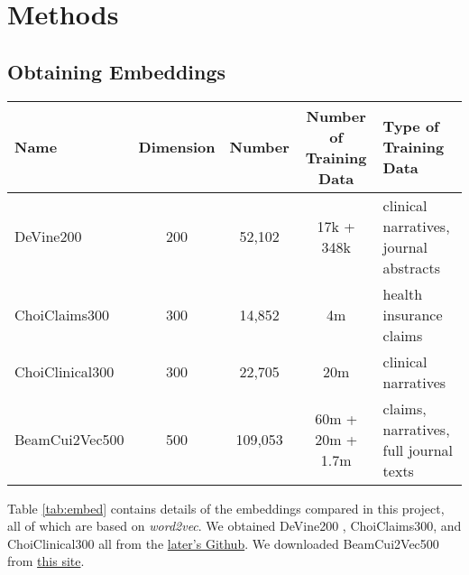 \documentclass[10pt]{article}
\begin{document}


\section{Methods}

\subsection{Obtaining Embeddings}

\begin{table*}[h!]
	\begin{center}
		\label{tab:embed}
		\begin{tabular}{l|c|c|c|l} %
			Name & Dimension & Number & Number of Training Data& Type of Training Data \\
			\hline
			DeVine200 & 200 & 52,102 & 17k + 348k &clinical narratives, journal abstracts\\
			ChoiClaims300 & 300 & 14,852& 4m&health insurance claims\\
			ChoiClinical300 & 300 & 22,705&20m& clinical narratives\\
			BeamCui2Vec500 & 500 & 109,053&60m + 20m + 1.7m& claims, narratives, full journal texts\\
		\end{tabular}
	\end{center}
\caption{Characteristics of the embeddings compared, including the name referred, the embedding dimensions, the number of embeddings in the dataset, and the type of data used to train them.}
\end{table*}

Table \ref{tab:embed} contains details of the embeddings compared in this project, all of which are based on \emph{word2vec}. We obtained DeVine200 \cite{devineMedicalSemanticSimilarity2014}, ChoiClaims300, and ChoiClinical300 \cite{choiLearningLowDimensionalRepresentations2016} all from the \href{https://github.com/clinicalml/embeddings}{later's Github}. We downloaded BeamCui2Vec500 \cite{beamClinicalConceptEmbeddings2018} from \href{https://figshare.com/s/00d69861786cd0156d81}{this site}. 
\end{document}
